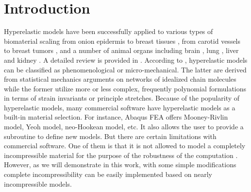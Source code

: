 \section{Introduction}
Hyperelastic models have been successfully applied to various types of biomaterial scaling from onion epidermis \cite{Qian} to breast tissues \cite{OHagen}, from carotid vessels \cite{Zidi, Zidi2, Bols} to breast tumors \cite{Oberai}, and a number of animal organs including brain \cite{Karimi, Samani, Gilchrist}, lung  \cite{Wall, Wall2}, liver and kidney \cite{Fu, Untaroiu, Willinger}. A detailed review is provided in \cite{Kupriyanova}.
According to \cite{Steinmann}, hyperelastic models can be classified as phenomenological or micro-mechanical. The latter are derived from statistical mechanics arguments on networks of idealized chain molecules while the former utilize more or less complex, frequently polynomial formulations in terms of strain invariants or principle stretches. Because of the popularity of hyperelastic models, many commercial software have hyperelastic models as a built-in material selection. For instance, Abaqus FEA offers Mooney-Rivlin model, Yeoh model, neo-Hookean model, etc. It also allows the user to provide a subroutine to define new models. But there are certain limitations with commercial software. One of them is that it is not allowed to model a completely incompressible material for the purpose of the robustness of the computation \cite{Abaqus}. However, as we will demonstrate in this work, with some simple modifications complete incompressibility can be easily implemented based on nearly incompressible models.

